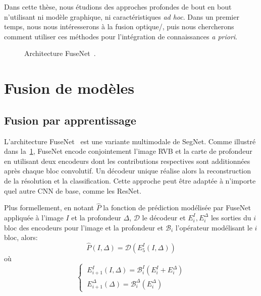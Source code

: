 Dans cette thèse, nous étudions des approches profondes de bout en bout n'utilisant ni modèle graphique, ni caractéristiques \emph{ad hoc}. Dans un premier temps, nous nous intéresserons à la fusion optique/, puis nous chercherons comment utiliser ces méthodes pour l'intégration de connaissances \emph{a priori}.

\begin{figure}[h]
    \resizebox{\textwidth}{!}{}
    \caption[Architecture FuseNet.]{Architecture FuseNet~\cite{hazirbas_fusenet_2016}.}
    \label{fig:fusenet}
\end{figure}

\section{Fusion de modèles}
\label{sec:fusion}

\subsection{Fusion par apprentissage}

L'architecture \gls{FuseNet}~\cite{hazirbas_fusenet_2016} est une variante multimodale de \gls{SegNet}. Comme illustré dans la~\cref{fig:fusenet}, FuseNet encode conjointement l'image \gls{RVB} et la carte de profondeur en utilisant deux encodeurs dont les contributions respectives sont additionnées après chaque bloc convolutif. Un décodeur unique réalise alors la reconstruction de la résolution et la classification. Cette approche peut être adaptée à n'importe quel autre \gls{CNN} de base, comme les \gls{ResNet}.

Plus formellement, en notant $\hat{P}$ la fonction de prédiction modélisée par FuseNet appliquée à l'image $I$ et la profondeur $\Delta$, $\mathcal{D}$ le décodeur et $E^I_i, E^\Delta_i$ les sorties du $i$\ieme bloc des encodeurs pour l'image et la profondeur et $\mathcal{B}_i$ l'opérateur modélisant le $i$\ieme bloc, alors:
\begin{equation}
\hat{P}(I,\Delta) = \mathcal{D}\left(E_5^I(I, \Delta)\right)
\end{equation}
où
\begin{equation}
  \begin{cases}
    ~E_{i+1}^I(I,\Delta) = \mathcal{B}_i^\mathit{I}\left(E_i^I + E_i^\Delta\right)\\
    ~E_{i+1}^\Delta(\Delta) = \mathcal{B}_i^\Delta(E_i^\Delta)
  \end{cases}
\end{equation}


